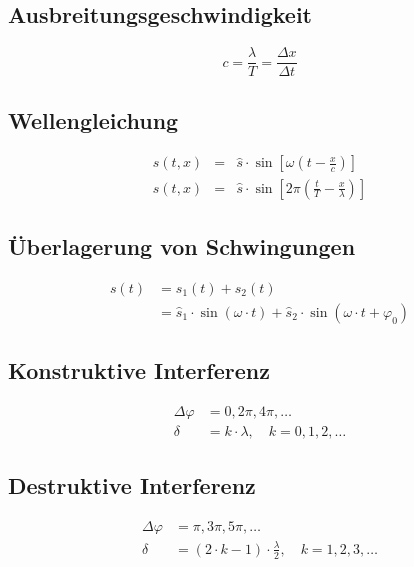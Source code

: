 
\subsection{Ausbreitungsgeschwindigkeit}
\begin{equation}\label{eq:wellen:ausbreitungsgeschwindigkeit}
c = \frac{\lambda}{T} =
\frac{\Delta x}{\Delta t}
\end{equation}

\subsection{Wellengleichung}
\begin{eqnarray}\label{eq:wellen:gleichung}
s(t,x) &=& \hat{s} \cdot \sin \left[ \omega \left( t - \frac{x}{c} \right)
\right]\\
s(t,x) &=& \hat{s} \cdot \sin \left[ 2\pi \left( \frac{t}{T} - \frac{x}{\lambda}
\right) \right]
\end{eqnarray}

\subsection{Überlagerung von Schwingungen}
\begin{equation}
\begin{split}
\label{eq:schwingung:ueberlagerung}
s(t) &= s_1(t) + s_2(t) \\
&= \hat{s}_1 \cdot \sin(\omega \cdot t) + \hat{s}_2 \cdot
\sin(\omega \cdot t + \varphi_0)
\end{split}
\end{equation}

\subsection{Konstruktive Interferenz}
\begin{equation}
\begin{split}
\label{eq:konstruktive:interferenz}
\Delta \varphi &= 0, 2\pi, 4\pi,\dots\\
 \delta &= k \cdot \lambda, \quad k = 0, 1, 2, \ldots
\end{split}
\end{equation}

\subsection{Destruktive Interferenz}
\begin{equation}
\begin{split}
\label{eq:destruktive:interferenz}
\Delta \varphi &= \pi, 3\pi, 5\pi,\dots \\
 \delta &= (2\cdot k - 1) \cdot \frac{\lambda}{2}, \quad k = 1, 2, 3, \ldots
\end{split}
\end{equation}


